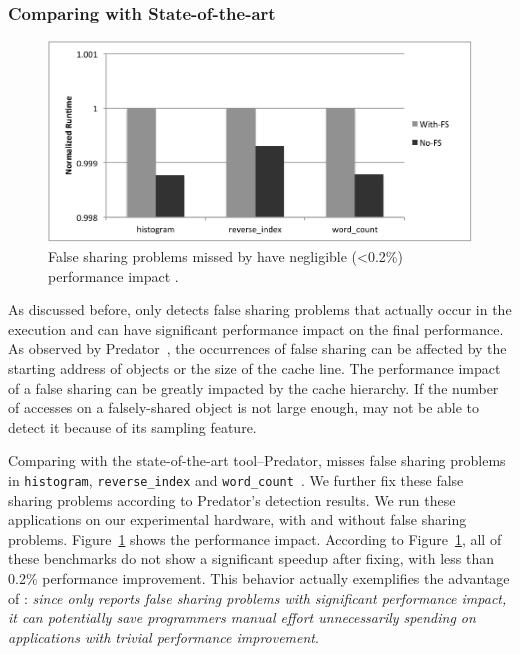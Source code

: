 \subsubsection{Comparing with State-of-the-art}

\begin{figure}[htbp]
\centering
\label{fig:fseffectiveness}
\includegraphics[width=.9\columnwidth]{figure/trivial.pdf}
\caption{False sharing problems missed by \cheetah{} have negligible (<0.2\%) performance impact .}
\end{figure}

As discussed before, \cheetah{} only detects false sharing problems that actually occur in the execution and can have significant performance impact on the final performance. As observed by Predator~\cite{Predator}, the occurrences of false sharing can be affected by the starting address of objects or the size of the cache line. The performance impact of a false sharing can be greatly impacted by the cache hierarchy. If the number of accesses on a falsely-shared object is not large enough, \cheetah{} may not be able to detect it because of its sampling feature. 

Comparing with the state-of-the-art tool--Predator, \cheetah{} misses false sharing problems in  \texttt{histogram}, \texttt{reverse\_index} and \texttt{word\_count}~\cite{Predator}. We further fix these false sharing problems according to Predator's detection results. We run these applications on our experimental hardware, with and without false sharing problems. Figure~\ref{fig:fseffectiveness} shows the performance impact. According to Figure~\ref{fig:fseffectiveness}, all of these benchmarks do not show a significant speedup after fixing, with less than 0.2\% performance improvement. This behavior actually exemplifies the advantage of \Cheetah{}: \emph{since \cheetah{} only reports false sharing problems with significant performance impact, it can potentially save programmers manual effort unnecessarily spending on applications with trivial performance improvement}. 

